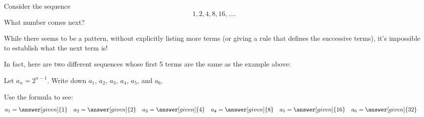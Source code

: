 \documentclass{ximera}
\begin{document}
\begin{question}
  Consider the sequence
  \[
  1, 2, 4, 8, 16, \dots.
  \]
  What number comes next?
  \begin{multipleChoice}
  \end{multipleChoice}

While there seems to be a pattern, without explicitly listing more terms (or giving a rule that defines the successive terms), it's impossible to establish what the next term is! 

\end{question}

In fact, here are two different sequences whose first 5 terms are the same as the example above:

\begin{example}
  Let $a_n = 2^{n-1}$.  Write down $a_1$, $a_2$, $a_3$, $a_4$, $a_5$, and
  $a_6$.
  \begin{explanation}
    Use the formula to see:
    \begin{align*}
      a_1 &= \answer[given]{1} & a_2 &= \answer[given]{2} & 
      a_3 &= \answer[given]{4} & 
      a_4 &= \answer[given]{8} & 
      a_5 &= \answer[given]{16} & 
      a_6 &= \answer[given]{32}
    \end{align*}
  \end{explanation}
\end{example}
\end{document}
